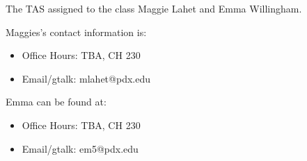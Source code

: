 The TAS assigned to the class Maggie Lahet and 
Emma Willingham. 

Maggies's contact information is:
\begin{itemize}
\item Office Hours: TBA, CH 230
\item Email/gtalk: mlahet@pdx.edu  
\end{itemize}

Emma can be found at:
\begin{itemize}
\item Office Hours: TBA, CH 230
\item Email/gtalk: em5@pdx.edu 
\end{itemize}
